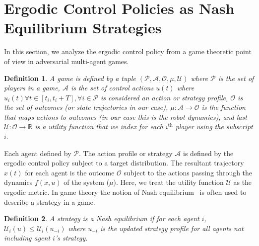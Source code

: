 \documentclass[letterpaper, 10 pt, conference]{ieeeconf}  %
\newtheorem{definition}{Definition}
\begin{document}
\section{Ergodic Control Policies as Nash Equilibrium Strategies}
\label{sec:ergodic-control-policies-as-nash-equilibrium-strategies}
In this section, we analyze the ergodic control policy from a game theoretic point of view in adversarial multi-agent games.
\begin{definition}
A game is defined by a tuple $(\mathcal{P}, \mathcal{A}, \mathcal{O}, \mu, \mathcal{U})$ where $\mathcal{P}$ is the set of players in a game, $\mathcal{A}$ is the set of control actions $u(t)$ where $u_i(t) \forall t \in \left[ t_i, t_i + T \right], \forall i \in \mathcal{P}$ is considered an action or strategy profile, $\mathcal{O}$ is the set of outcomes (or state trajectories in our case), $\mu : \mathcal{A} \to \mathcal{O}$ is the function that maps actions to outcomes (in our case this is the robot dynamics), and last $\mathcal{U} : \mathcal{O} \to \mathbb{R}$ is a utility function that we index for each $i^\text{th}$ player using the subscript $i$.
\end{definition}

Each agent defined by $\mathcal{P}$.
The action profile or strategy $\mathcal{A}$ is defined by the ergodic control policy subject to a target distribution.
The resultant trajectory $x(t)$ for each agent is the outcome $\mathcal{O}$ subject to the actions passing through the dynamics $f(x,u)$ of the system ($\mu$).
Here, we treat the utility function $\mathcal{U}$ as the ergodic metric.
In game theory the notion of Nash equilibrium~\cite{bhattacharya2009existence, myerson1978refinements} is often used to describe a strategy in a game.
\begin{definition}
A strategy is a Nash equilibrium if for each agent $i$, $\mathcal{U}_i(u) \le \mathcal{U}_i( u_{-i})$ where $u_{ -i}$ is the updated strategy profile for all agents not including agent $i$'s strategy.
\end{definition}
\end{document}
